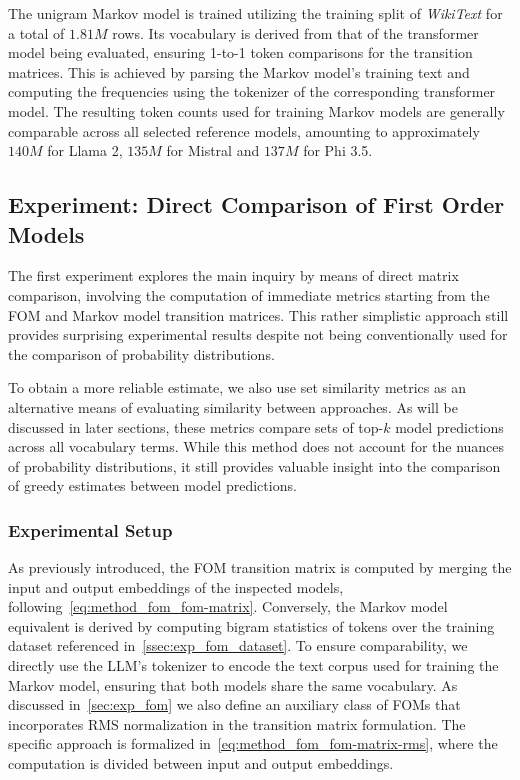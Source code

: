 The unigram Markov model is trained utilizing the training split of \emph{WikiText} for a total of $1.81M$ rows.
Its vocabulary is derived from that of the transformer model being evaluated, ensuring 1-to-1 token comparisons for the transition matrices.
This is achieved by parsing the Markov model's training text and computing the frequencies using the tokenizer of the corresponding transformer model.
The resulting token counts used for training Markov models are generally comparable across all selected reference models, amounting to approximately $140M$ for Llama 2, $135M$ for Mistral and $137M$ for Phi 3.5.

\subsection{Experiment: Direct Comparison of First \texorpdfstring{\linebreak}{} Order Models}\label{ssec:exp_fom_exp1}

The first experiment explores the main inquiry by means of direct matrix comparison, involving the computation of immediate metrics starting from the FOM and Markov model transition matrices.
This rather simplistic approach still provides surprising experimental results despite not being conventionally used for the comparison of probability distributions.

To obtain a more reliable estimate, we also use set similarity metrics as an alternative means of evaluating similarity between approaches.
As will be discussed in later sections, these metrics compare sets of top-$k$ model predictions across all vocabulary terms.
While this method does not account for the nuances of probability distributions, it still provides valuable insight into the comparison of greedy estimates between model predictions.

\subsubsection{Experimental Setup}\label{sssec:exp_fom_exp1_expset}

As previously introduced, the FOM transition matrix is computed by merging the input and output embeddings of the inspected models, following~\cref{eq:method_fom_fom-matrix}.
Conversely, the Markov model equivalent is derived by computing bigram statistics of tokens over the training dataset referenced in~\cref{ssec:exp_fom_dataset}.
To ensure comparability, we directly use the LLM's tokenizer to encode the text corpus used for training the Markov model, ensuring that both models share the same vocabulary.
As discussed in~\cref{sec:exp_fom} we also define an auxiliary class of FOMs that incorporates RMS normalization in the transition matrix formulation.
The specific approach is formalized in~\cref{eq:method_fom_fom-matrix-rms}, where the computation is divided between input and output embeddings.

